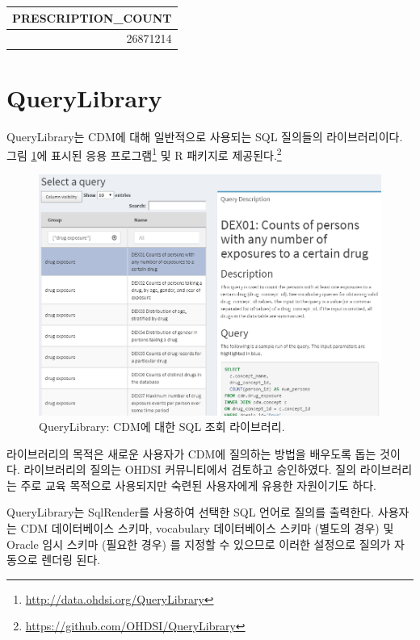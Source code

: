 \documentclass[11pt]{book}
\let\rmarkdownfootnote\footnote%
\def\footnote{\protect\rmarkdownfootnote}
\theoremstyle{definition}
\theoremstyle{definition}
\theoremstyle{definition}
\theoremstyle{remark}
\begin{document}
\begin{longtable}[]{@{}r@{}}
\toprule
PRESCRIPTION\_COUNT\tabularnewline
\midrule
\endhead
26871214\tabularnewline
\bottomrule
\end{longtable}

\section{QueryLibrary}\label{querylibrary}


QueryLibrary는 CDM에 대해 일반적으로 사용되는 SQL 질의들의
라이브러리이다. 그림 \ref{fig:queryLibrary}에 표시된 응용
프로그램\footnote{\url{http://data.ohdsi.org/QueryLibrary}} 및 R
패키지로 제공된다.\footnote{\url{https://github.com/OHDSI/QueryLibrary}}

\begin{figure}

{\centering \includegraphics[width=1\linewidth]{images/SqlAndR/queryLibrary} 

}

\caption{QueryLibrary: CDM에 대한 SQL 조회 라이브러리.}\label{fig:queryLibrary}
\end{figure}

라이브러리의 목적은 새로운 사용자가 CDM에 질의하는 방법을 배우도록 돕는
것이다. 라이브러리의 질의는 OHDSI 커뮤니티에서 검토하고 승인하였다. 질의
라이브러리는 주로 교육 목적으로 사용되지만 숙련된 사용자에게 유용한
자원이기도 하다.

QueryLibrary는 SqlRender를 사용하여 선택한 SQL 언어로 질의를 출력한다.
사용자는 CDM 데이터베이스 스키마, vocabulary 데이터베이스 스키마 (별도의
경우) 및 Oracle 임시 스키마 (필요한 경우) 를 지정할 수 있으므로 이러한
설정으로 질의가 자동으로 렌더링 된다.
\end{document}
